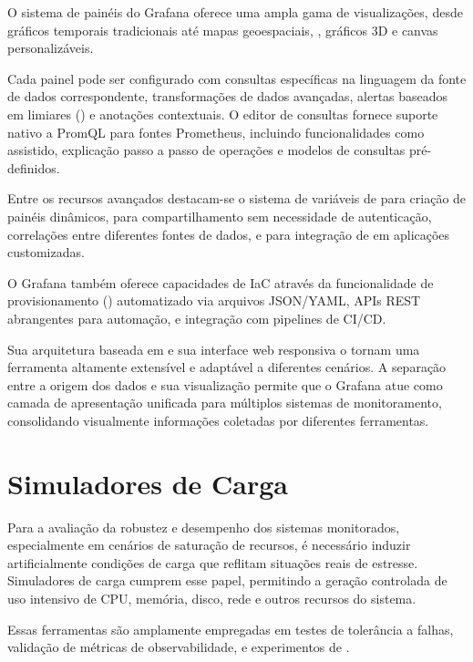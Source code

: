 O sistema de painéis do Grafana oferece uma ampla gama de visualizações, desde gráficos temporais tradicionais até mapas geoespaciais, , gráficos 3D e canvas personalizáveis.

Cada painel pode ser configurado com consultas específicas na linguagem da fonte de dados correspondente, transformações de dados avançadas, alertas baseados em limiares () e anotações contextuais. O editor de consultas fornece suporte nativo a PromQL para fontes Prometheus, incluindo funcionalidades como  assistido, explicação passo a passo de operações e modelos de consultas pré-definidos.

Entre os recursos avançados destacam-se o sistema de variáveis de  para criação de painéis dinâmicos,  para compartilhamento sem necessidade de autenticação, correlações entre diferentes fontes de dados, e  para integração de  em aplicações customizadas.

O Grafana também oferece capacidades de IaC através da funcionalidade de provisionamento () automatizado via arquivos JSON/YAML, APIs REST abrangentes para automação, e integração com pipelines de CI/CD.

Sua arquitetura baseada em  e sua interface web responsiva o tornam uma ferramenta altamente extensível e adaptável a diferentes cenários. A separação entre a origem dos dados e sua visualização permite que o Grafana atue como camada de apresentação unificada para múltiplos sistemas de monitoramento, consolidando visualmente informações coletadas por diferentes ferramentas.

\section{Simuladores de Carga}
\label{section:SimuladoresCarga}

Para a avaliação da robustez e desempenho dos sistemas monitorados, especialmente em cenários de saturação de recursos, é necessário induzir artificialmente condições de carga que reflitam situações reais de estresse. Simuladores de carga cumprem esse papel, permitindo a geração controlada de uso intensivo de CPU, memória, disco, rede e outros recursos do sistema.

Essas ferramentas são amplamente empregadas em testes de tolerância a falhas, validação de métricas de observabilidade, e experimentos de .

